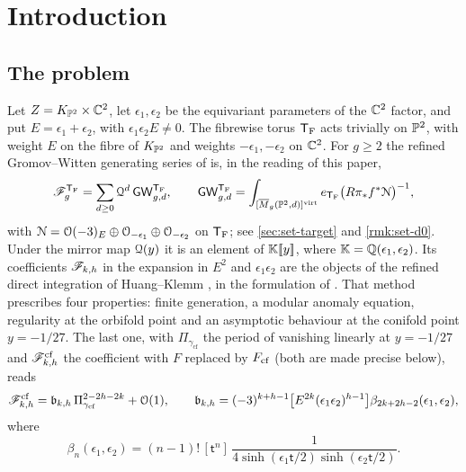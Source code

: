 \section{Introduction}
\label{sec:int}

\subsection{The problem}
\label{sec:int-problem}

Let $Z=K_{\mathbb{P}^2}\times\mathbb{C}^2$, let $\epsilon_1,\epsilon_2$ be the equivariant parameters of the $\mathbb{C}^2$ factor, and put $E=\epsilon_1+\epsilon_2$, with $\epsilon_1\epsilon_2E\neq 0$. The fibrewise torus $\mathsf{T}_{\mathrm{F}}$ acts trivially on $\mathbb{P}^2$, with weight $E$ on the fibre of $K_{\mathbb{P}^2}$ and weights $-\epsilon_1,-\epsilon_2$ on $\mathbb{C}^2$. For $g\geq 2$ the refined Gromov--Witten generating series of \cite{BS} is, in the reading of this paper,
\[
\mathscr{F}_g^{\mathsf{T}_{\mathrm{F}}}=\sum_{d\geq 0}\mathcal{Q}^d\,\mathsf{GW}_{g,d}^{\mathsf{T}_{\mathrm{F}}},\qquad \mathsf{GW}_{g,d}^{\mathsf{T}_{\mathrm{F}}}=\int_{[\overline{M}_g(\mathbb{P}^2,d)]^{\mathrm{virt}}}e_{\mathsf{T}_{\mathrm{F}}}\big(R\pi_*f^*\mathcal{N}\big)^{-1},
\]
with $\mathcal{N}=\mathcal{O}(-3)_{E}\oplus\mathcal{O}_{-\epsilon_1}\oplus\mathcal{O}_{-\epsilon_2}$ on $\mathsf{T}_{\mathrm{F}}$; see \cref{sec:set-target} and \cref{rmk:set-d0}. Under the mirror map $\mathcal{Q}(y)$ it is an element of $\mathbb{K}[\![ y ]\!]$, where $\mathbb{K}=\mathbb{Q}(\epsilon_1,\epsilon_2)$. Its coefficients $\mathscr{F}_{k,h}$ in the expansion in $E^{2}$ and $\epsilon_1\epsilon_2$ are the objects of the refined direct integration of Huang--Klemm \cite{HK10}, in the formulation of \cite{BS}.  That method prescribes four properties: finite generation, a modular anomaly equation, regularity at the orbifold point and an asymptotic behaviour at the conifold point $y=-1/27$. The last one, with $\Pi_{\gamma_{\mathrm{cf}}}$ the period of \cite{BS} vanishing linearly at $y=-1/27$ and $\mathscr{F}^{\mathrm{cf}}_{k,h}$ the coefficient with $F$ replaced by $F_{\mathrm{cf}}$ (both are made precise below), reads
\[
\mathscr{F}^{\mathrm{cf}}_{k,h}=\mathfrak{b}_{k,h}\,\Pi_{\gamma_{\mathrm{cf}}}^{2-2h-2k}+\mathcal{O}(1),\qquad
\mathfrak{b}_{k,h}=(-3)^{k+h-1}\big[E^{2k}(\epsilon_1\epsilon_2)^{h-1}\big]\beta_{2k+2h-2}(\epsilon_1,\epsilon_2),
\]
where
\[
\beta_n(\epsilon_1,\epsilon_2)=(n-1)!\,[\mathsf{t}^n]\,\frac{1}{4\sinh(\epsilon_1\mathsf{t}/2)\sinh(\epsilon_2\mathsf{t}/2)}.
\]
